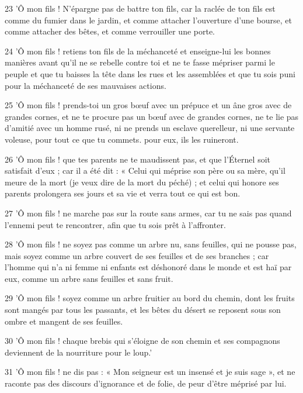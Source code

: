 \par 23 'Ô mon fils ! N'épargne pas de battre ton fils, car la raclée de ton fils est comme du fumier dans le jardin, et comme attacher l'ouverture d'une bourse, et comme attacher des bêtes, et comme verrouiller une porte.

\par 24 'Ô mon fils ! retiens ton fils de la méchanceté et enseigne-lui les bonnes manières avant qu'il ne se rebelle contre toi et ne te fasse mépriser parmi le peuple et que tu baisses la tête dans les rues et les assemblées et que tu sois puni pour la méchanceté de ses mauvaises actions.

\par 25 'Ô mon fils ! prends-toi un gros bœuf avec un prépuce et un âne gros avec de grandes cornes, et ne te procure pas un bœuf avec de grandes cornes, ne te lie pas d'amitié avec un homme rusé, ni ne prends un esclave querelleur, ni une servante voleuse, pour tout ce que tu commets. pour eux, ils les ruineront.

\par 26 'Ô mon fils ! que tes parents ne te maudissent pas, et que l'Éternel soit satisfait d'eux ; car il a été dit : « Celui qui méprise son père ou sa mère, qu'il meure de la mort (je veux dire de la mort du péché) ; et celui qui honore ses parents prolongera ses jours et sa vie et verra tout ce qui est bon.

\par 27 'Ô mon fils ! ne marche pas sur la route sans armes, car tu ne sais pas quand l'ennemi peut te rencontrer, afin que tu sois prêt à l'affronter.

\par 28 'Ô mon fils ! ne soyez pas comme un arbre nu, sans feuilles, qui ne pousse pas, mais soyez comme un arbre couvert de ses feuilles et de ses branches ; car l'homme qui n'a ni femme ni enfants est déshonoré dans le monde et est haï par eux, comme un arbre sans feuilles et sans fruit.

\par 29 'Ô mon fils ! soyez comme un arbre fruitier au bord du chemin, dont les fruits sont mangés par tous les passants, et les bêtes du désert se reposent sous son ombre et mangent de ses feuilles.

\par 30 'Ô mon fils ! chaque brebis qui s'éloigne de son chemin et ses compagnons deviennent de la nourriture pour le loup.'

\par 31 'Ô mon fils ! ne dis pas : « Mon seigneur est un insensé et je suis sage », et ne raconte pas des discours d'ignorance et de folie, de peur d'être méprisé par lui.

